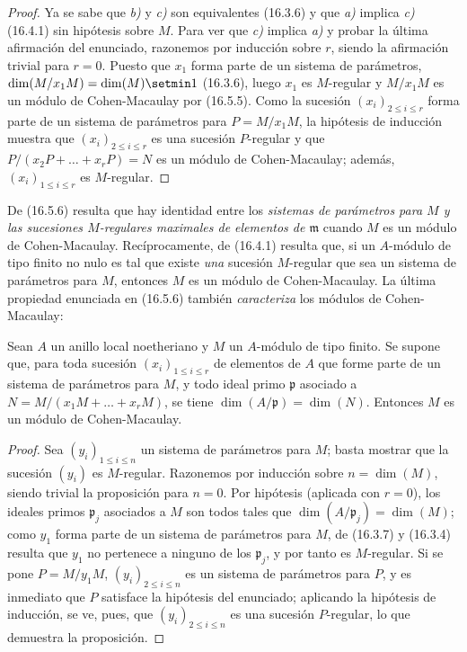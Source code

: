 \begin{proof}
Ya se sabe que \emph{b)} y \emph{c)} son equivalentes (16.3.6) y que \emph{a)} implica \emph{c)}
(16.4.1) sin hipótesis sobre $M$. Para ver que \emph{c)} implica \emph{a)} y probar la
última afirmación del enunciado, razonemos por inducción sobre $r$, siendo la
afirmación trivial para $r=0$. Puesto que $x_1$ forma parte de un sistema de
parámetros, $\dim(M/x_1M)=\dim(M)\setmin 1$ (16.3.6), luego $x_1$ es $M$-regular y
$M/x_1M$ es un módulo de Cohen-Macaulay por (16.5.5). Como la sucesión
$(x_i)_{2\leq i\leq r}$ forma parte de un sistema de parámetros para
$P=M/x_1M$, la hipótesis de inducción muestra que $(x_i)_{2\leq i\leq r}$ es
una sucesión $P$-regular y que
$P/(x_2P+\ldots+x_rP)=N$ es un módulo de Cohen-Macaulay; además,
$(x_i)_{1\leq i\leq r}$ es $M$-regular.
\end{proof}

\begin{remark}[16.5.7]
\label{0.16.5.7-es}
De (16.5.6) resulta que hay identidad entre los \emph{sistemas de
parámetros para $M$ y las sucesiones $M$-regulares maximales de elementos de
$\mathfrak{m}$} cuando $M$ es un módulo de Cohen-Macaulay. Recíprocamente, de
(16.4.1) resulta que, si un $A$-módulo de tipo finito no nulo es tal que existe
\emph{una} sucesión $M$-regular que sea un sistema de parámetros para $M$, entonces
$M$ es un módulo de Cohen-Macaulay. La última propiedad enunciada en
(16.5.6) también \emph{caracteriza} los módulos de Cohen-Macaulay:
\end{remark}

\begin{proposition}[16.5.8]
\label{0.16.5.8-es}
Sean $A$ un anillo local noetheriano y $M$ un $A$-módulo de tipo finito. Se
supone que, para toda sucesión $(x_i)_{1\leq i\leq r}$ de elementos de $A$
que forme parte de un sistema de parámetros para $M$, y todo ideal primo
$\mathfrak{p}$ asociado a
$N=M/(x_1M+\ldots+x_rM)$, se tiene
$\dim(A/\mathfrak{p})=\dim(N)$. Entonces $M$ es un módulo de Cohen-Macaulay.
\end{proposition}

\begin{proof}
Sea $(y_i)_{1\leq i\leq n}$ un sistema de parámetros para $M$; basta
mostrar que la sucesión $(y_i)$ es $M$-regular. Razonemos por inducción sobre
$n=\dim(M)$, siendo trivial la proposición para $n=0$. Por hipótesis
(aplicada con $r=0$), los ideales primos $\mathfrak{p}_j$ asociados a $M$
son todos tales que $\dim(A/\mathfrak{p}_j)=\dim(M)$; como $y_1$ forma parte
de un sistema de parámetros
para $M$, de (16.3.7) y (16.3.4) resulta que $y_1$ no pertenece a ninguno
de los $\mathfrak{p}_j$, y por tanto es $M$-regular. Si se pone $P=M/y_1M$,
$(y_i)_{2\leq i\leq n}$ es un sistema de parámetros para $P$, y es
inmediato que $P$ satisface la hipótesis del enunciado; aplicando la hipótesis
de inducción, se ve, pues, que $(y_i)_{2\leq i\leq n}$ es una sucesión
$P$-regular, lo que demuestra la proposición.
\end{proof}

